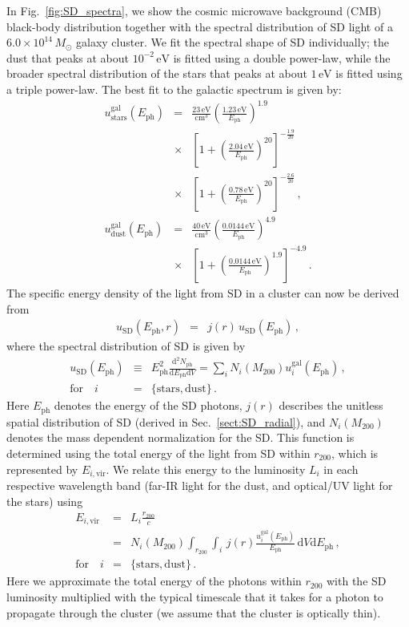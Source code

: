 \documentclass[10pt,aps,pra,reprint,amsmath,amsfonts,amssymb,showpacs,nofootinbib,floatfix]{revtex4-1}
\newcommand{\rmn}{\mathrm}
\newcommand{\ph}{\rmn{ph}}
\newcommand{\eph}{E_\ph}
\newcommand{\vir}{\rmn{vir}}
\newcommand{\gal}{\rmn{gal}}
\newcommand{\sd}{\rmn{SD}}
\newcommand{\msun}{M_\odot}
\newcommand{\stars}{\rmn{stars}}
\newcommand{\dust}{\rmn{dust}}
\newcommand{\ev}{\rmn{eV}}
\newcommand{\dd}{\rmn{d}}
\newcommand{\rvir}{r_{200}}
\newcommand{\mvir}{M_{200}}
\begin{document}
In Fig.~\ref{fig:SD_spectra}, we show the cosmic microwave background
(CMB) black-body distribution together with the spectral distribution
of SD light of a $6.0\times10^{14}\,\msun$ galaxy cluster. We fit the
spectral shape of SD individually; the dust that peaks at about
$10^{-2}\,\ev$ is fitted using a double power-law, while the broader
spectral distribution of the stars that peaks at about $1\,\ev$ is
fitted using a triple power-law. The best fit to the galactic spectrum
is given by:
\begin{eqnarray}
  u_\stars^\gal(\eph) &=& \frac{23\,\rmn{eV}}{\rmn{cm}^3}
  \left(\frac{1.23\,\rmn{eV}}{\eph}\right)^{1.9} \nonumber \\
  &\times&\left[1+\left(\frac{2.04\,\rmn{eV}}{\eph}\right)^{20}\right]
  ^{-\frac{1.9}{20}}\nonumber \\
  &\times& \left[1+\left(\frac{0.78\,\rmn{eV}}{\eph}\right)^{20}\right]^{-\frac{2.6}{20}}\,, \\
  u_\dust^\gal(\eph) &=&
  \frac{40\,\rmn{eV}}{\rmn{cm}^3}
  \left(\frac{0.0144\,\rmn{eV}}{\eph}\right)^{4.9}\nonumber \\
  &\times& \left[1+\left(\frac{0.0144\,\rmn{eV}}{\eph}\right)^{1.9}\right]^{-4.9}\,.
\end{eqnarray}
The specific energy density of the light from SD in a cluster can now
be derived from
\begin{eqnarray}
u_\sd(\eph, r) &=& j(r)\,u_\sd(\eph)\,,
\label{eq:u_SD_er}
\end{eqnarray}
where the spectral distribution of SD is given by
\begin{eqnarray}
  u_\sd(\eph) &\equiv& \eph^2\frac{\dd^2 N_\ph}{\dd \eph \dd V}
  = \sum_i N_i(\mvir) u_i^\gal(\eph)\,,\nonumber \\
\rmn{for}\quad i&=&\{\rmn{stars,dust}\}\,.
\end{eqnarray}
Here $\eph$ denotes the energy of the SD photons, $j(r)$ describes the
unitless spatial distribution of SD (derived in
Sec.~\ref{sect:SD_radial}), and $N_i(\mvir)$ denotes the mass
dependent normalization for the SD. This function is determined using
the total energy of the light from SD within $\rvir$, which is
represented by $E_{i,\vir}$. We relate this energy to the luminosity
$L_i$ in each respective wavelength band (far-IR light for the
dust, and optical/UV light for the stars) using
\begin{eqnarray}
  E_{i,\vir} &=& L_i \frac{\rvir}{c} \nonumber \\
  &=&N_i(\mvir)\int_{\rvir} \int_i \,j(r)
  \frac{u_i^\gal(\eph)}{\eph}\,\dd V\dd \eph\,,\nonumber \\
 \rmn{for}\quad i&=&\{\rmn{stars,dust}\}\,.
\label{eq:E_SD}
\end{eqnarray}
Here we approximate the total energy of the photons within $\rvir$
with the SD luminosity multiplied with the typical timescale that it
takes for a photon to propagate through the cluster (we assume that
the cluster is optically thin).
\end{document}
